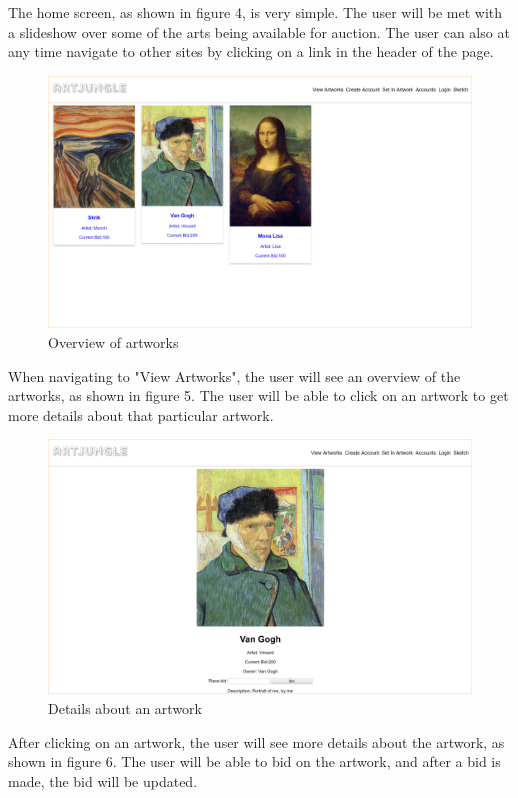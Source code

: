 The home screen, as shown in figure 4, is very simple. The user will be met with a slideshow over some of the arts being available for auction. The user can also at any time navigate to other sites by clicking on a link in the header of the page. 

\begin{figure}[h!]
  \centering
  \includegraphics[scale=0.3]{figs/viewartworks.png}
  \caption{Overview of artworks}
\end{figure}

When navigating to "View Artworks", the user will see an overview of the artworks, as shown in figure 5. The user will be able to click on an artwork to get more details about that particular artwork. 

\begin{figure}[h!]
  \centering
  \includegraphics[scale=0.3]{figs/artwork.png}
  \caption{Details about an artwork}
\end{figure}

After clicking on an artwork, the user will see more details about the artwork, as shown in figure 6. The user will be able to bid on the artwork, and after a bid is made, the bid will be updated.  

